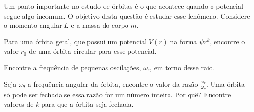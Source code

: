 \documentclass[11pt]{article}
\begin{document}
\begin{pproblem} Um ponto importante no estudo de órbitas é o que acontece quando o potencial segue algo incomum. O objetivo desta questão é estudar esse fenômeno. Considere o momento angular \(L\) e a massa do corpo \(m\).
    \begin{alternativas}
        \item Para uma órbita geral, que possui um potencial \(V(r)\) na forma \(\psi r^k\), encontre o valor \(r_0\) de uma órbita circular para esse potencial.
        
        \item Encontre a frequência de pequenas oscilações, \(\omega_r\), em torno desse raio. 
        
        \item Seja \(\omega_\theta\) a frequência angular da órbita, encontre o valor da razão \(\frac{\omega_r}{\omega_\theta}\). Uma órbita só pode ser fechada se essa razão for um número inteiro. Por quê? Encontre valores de \(k\) para que a órbita seja fechada.
         
    \end{alternativas} 

    
\end{pproblem}
\end{document}
